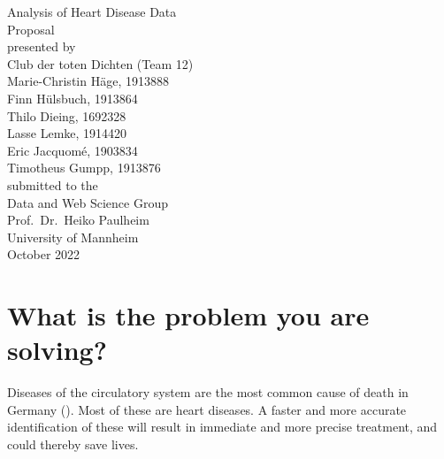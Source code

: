 \documentclass[11pt,titlepage,oneside,openany]{article}
\begin{document}
\begin{titlepage}
	\vspace*{2cm}
  \begin{center}
   {\Large Analysis of Heart Disease Data\\}
   \vspace{2cm} 
   {Proposal\\}
   \vspace{2cm}
   {presented by\\
   	Club der toten Dichten (Team 12)\\
    Marie-Christin Häge, 1913888 \\
    Finn Hülsbuch, 1913864 \\
    Thilo Dieing, 1692328 \\
    Lasse Lemke, 1914420 \\
    Eric Jacquomé, 1903834 \\
    Timotheus Gumpp, 1913876 \\
   }
   \vspace{1cm} 
   {submitted to the\\
    Data and Web Science Group\\
    Prof.\ Dr.\ Heiko Paulheim\\
    University of Mannheim\\} \vspace{2cm}
   {October 2022}
  \end{center}
\end{titlepage} 






\newpage





\section{What is the problem you are solving?}
\label{sec:problem}

Diseases of the circulatory system are the most common cause of death in Germany (\cite{statistischesbundesamt2022}).
Most of these are heart diseases. A faster and more accurate identification of these will result in immediate and more precise treatment, and could thereby save lives.
\end{document}
